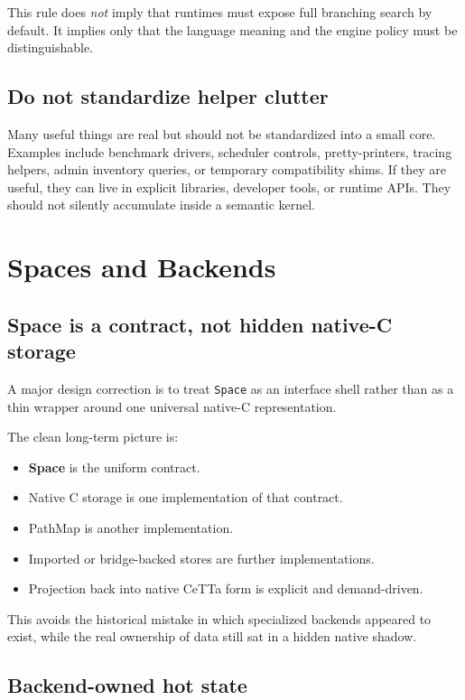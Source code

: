 \documentclass[11pt]{article}
\newcommand{\code}[1]{\texttt{#1}}
\newcommand{\strong}[1]{\textbf{#1}}
\begin{document}
This rule does \emph{not} imply that runtimes must expose full branching search by default. It implies only that the language meaning and the engine policy must be distinguishable.

\subsection{Do not standardize helper clutter}

Many useful things are real but should not be standardized into a small core. Examples include benchmark drivers, scheduler controls, pretty-printers, tracing helpers, admin inventory queries, or temporary compatibility shims. If they are useful, they can live in explicit libraries, developer tools, or runtime APIs. They should not silently accumulate inside a semantic kernel.

\section{Spaces and Backends}

\subsection{Space is a contract, not hidden native-C storage}

A major design correction is to treat \code{Space} as an interface shell rather than as a thin wrapper around one universal native-C representation.

The clean long-term picture is:

\begin{itemize}
  \item \strong{Space} is the uniform contract.
  \item Native C storage is one implementation of that contract.
  \item PathMap is another implementation.
  \item Imported or bridge-backed stores are further implementations.
  \item Projection back into native CeTTa form is explicit and demand-driven.
\end{itemize}

This avoids the historical mistake in which specialized backends appeared to exist, while the real ownership of data still sat in a hidden native shadow.

\subsection{Backend-owned hot state}
\end{document}

